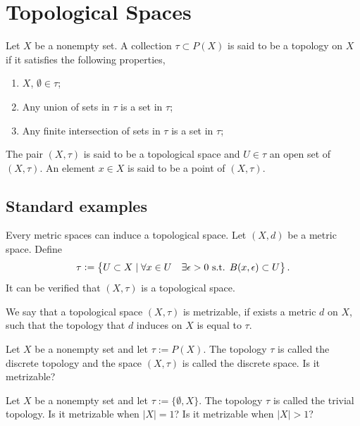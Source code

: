 \documentclass[11pt,a4paper]{article}
\begin{document}
\newpage

\section{Topological Spaces}\label{sec:topological-spaces}
\begin{definition}
  Let $X$ be a nonempty set. A collection $\tau \subset P(X)$ is said to
  be a topology on $X$ if it satisfies the following properties,
  \begin{enumerate}
    \item[(1)] $X$, $\emptyset \in \tau$;
    \item[(2)] Any union of sets in $\tau$ is a set in $\tau$;
    \item[(3)] Any finite intersection of sets in $\tau$ is a set in $\tau$;
  \end{enumerate}
  The pair $(X,\tau)$ is said to be a topological space and $U \in \tau$
  an open set of $(X,\tau)$. An element $x \in X$ is said to be a point
  of $(X,\tau)$.
\end{definition}

\subsection{Standard examples}

\begin{example}
  Every metric spaces can induce a topological space. Let $(X,d)$ be a
  metric space. Define
  \[
    \tau := \left\{U \subset X \mid \forall x \in U \quad \exists \epsilon > 0
    \text{ s.t. } B(x,\epsilon) \subset U\right\}.
  \]
  It can be verified that $(X,\tau)$ is a topological space.
\end{example}

\begin{definition}
  We say that a topological space $(X,\tau)$ is metrizable, if exists a 
  metric $d$ on $X$, such that the topology that $d$ induces on $X$
  is equal to $\tau$.
\end{definition}

\begin{example}
  Let $X$ be a nonempty set and let $\tau := P(X)$. The topology $\tau$
  is called the discrete topology and the space $(X,\tau)$ is called the 
  discrete space. Is it metrizable?
\end{example}

\begin{example}
  Let $X$ be a nonempty set and let $\tau := \{\emptyset,X\}$. The topology 
  $\tau$ is called the trivial topology. Is it metrizable when $|X| = 1$?
  Is it metrizable when $|X| > 1$?
\end{example}
\end{document}
